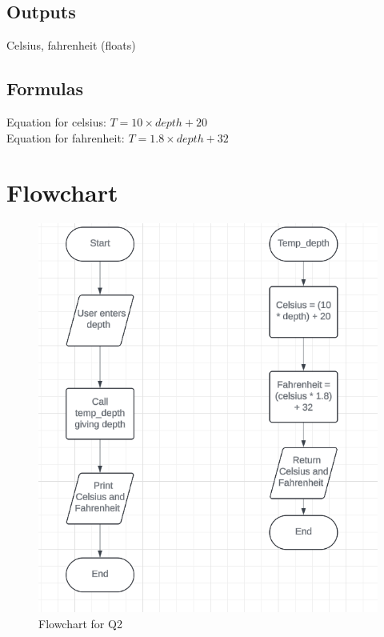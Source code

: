 \documentclass{article}
\begin{document}
\begin{flushleft}
  \subsection{Outputs}
  Celsius, fahrenheit (floats)
  \subsection{Formulas}
  Equation for celsius: $T = 10 \times depth + 20$\\
  Equation for fahrenheit: $T = 1.8 \times depth + 32$
  \section{Flowchart}
    \begin{figure}[!h]
      \begin{centering}
        \includegraphics[scale=0.75]{Q2_Flowchart.png}
        \caption{Flowchart for Q2}
      \end{centering}
    \end{figure}
    \newpage

\end{flushleft}
\end{document}
